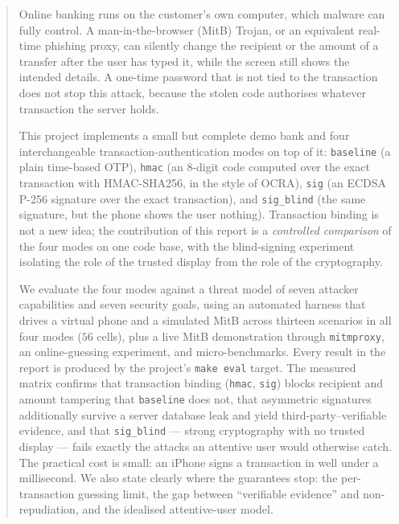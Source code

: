 \begin{abstract}
\noindent
Online banking runs on the customer's own computer, which malware can fully
control. A man-in-the-browser (MitB) Trojan, or an equivalent real-time
phishing proxy, can silently change the recipient or the amount of a transfer
after the user has typed it, while the screen still shows the intended details.
A one-time password that is not tied to the transaction does not stop this
attack, because the stolen code authorises whatever transaction the server
holds.

This project implements a small but complete demo bank and four interchangeable
transaction-authentication modes on top of it: \texttt{baseline} (a plain
time-based OTP), \texttt{hmac} (an 8-digit code computed over the exact
transaction with HMAC-SHA256, in the style of OCRA), \texttt{sig} (an ECDSA
P-256 signature over the exact transaction), and \texttt{sig\_blind} (the same
signature, but the phone shows the user nothing). Transaction binding is not a
new idea; the contribution of this report is a \emph{controlled comparison} of
the four modes on one code base, with the blind-signing experiment isolating
the role of the trusted display from the role of the cryptography.

We evaluate the four modes against a threat model of seven attacker
capabilities and seven security goals, using an automated harness that drives a
virtual phone and a simulated MitB across thirteen scenarios in all four modes
($56$ cells), plus a live MitB demonstration through \texttt{mitmproxy}, an
online-guessing experiment, and micro-benchmarks. Every result in the report is
produced by the project's \texttt{make eval} target. The measured matrix
confirms that transaction binding (\texttt{hmac}, \texttt{sig}) blocks recipient
and amount tampering that \texttt{baseline} does not, that asymmetric signatures
additionally survive a server database leak and yield third-party--verifiable
evidence, and that \texttt{sig\_blind} --- strong cryptography with no trusted
display --- fails exactly the attacks an attentive user would otherwise catch.
The practical cost is small: an iPhone signs a transaction in well under a
millisecond. We also state clearly where the guarantees stop: the per-transaction
guessing limit, the gap between ``verifiable evidence'' and non-repudiation, and
the idealised attentive-user model.
\end{abstract}
